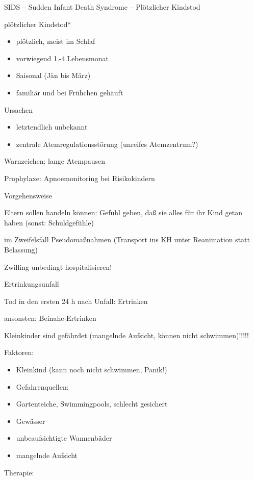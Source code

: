 \documentclass{article}
\begin{document}
SIDS -- Sudden Infant Death Syndrome -- Pl\"otzlicher Kindstod

{\quotedblbase}pl\"otzlicher
Kindstod{\textquotedblleft}

\begin{itemize}
\item pl\"otzlich, meist im Schlaf

\item vorwiegend 1.-4.Lebensmonat

\item Saisonal (J\"an bis M\"arz)

\item famili\"ar und bei Fr\"uhchen geh\"auft

\end{itemize}
Ursachen

\begin{itemize}
\item letztendlich unbekannt

\item zentrale Atemregulationsst\"orung (unreifes  Atemzentrum?)

\end{itemize}
Warnzeichen:  lange Atempausen

Prophylaxe: Apnoemonitoring bei  Risikokindern

Vorgehensweise

Eltern sollen handeln k\"onnen: Gef\"uhl geben,  da{\ss} sie alles f\"ur
ihr Kind getan haben (sonst:  Schuldgef\"uhle)

im Zweifelsfall Pseudoma{\ss}nahmen (Transport  ins KH unter Reanimation
statt Belassung)

Zwilling unbedingt hospitalisieren!

Ertrinkungsunfall

Tod in den ersten 24 h nach Unfall: Ertrinken

ansonsten: Beinahe-Ertrinken

Kleinkinder sind gef\"ahrdet (mangelnde  Aufsicht, k\"onnen nicht
schwimmen)!!!!!

Faktoren:

\begin{itemize}
\item Kleinkind (kann noch nicht schwimmen,  Panik!)

\item Gefahrenquellen:

\item Gartenteiche, Swimmingpools, schlecht  gesichert

\item Gew\"asser

\item unbeaufsichtigte Wannenb\"ader

\item mangelnde Aufsicht

\end{itemize}
Therapie:
\end{document}
